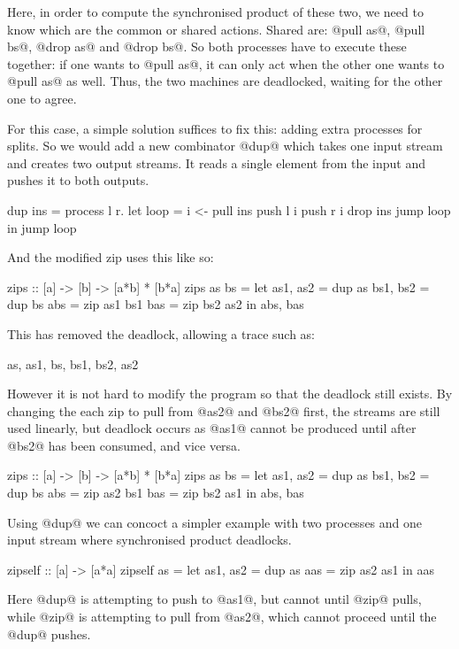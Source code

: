 Here, in order to compute the synchronised product of these two, we need to know which are the common or shared actions.
Shared are: @pull as@, @pull bs@, @drop as@ and @drop bs@.
So both processes have to execute these together: if one wants to @pull as@, it can only act when the other one wants to @pull as@ as well.
Thus, the two machines are deadlocked, waiting for the other one to agree.

For this case, a simple solution suffices to fix this: adding extra processes for splits. So we would add a new combinator @dup@ which takes one input stream and creates two output streams. It reads a single element from the input and pushes it to both outputs.

\begin{code}
dup ins = process l r.
  let loop =
     i <- pull ins
     push l i
     push r i
     drop ins
     jump loop
  in jump loop
\end{code}
And the modified zip uses this like so:

\begin{code}
zips :: [a] -> [b] -> [a*b] * [b*a]
zips as bs =
  let as1, as2 = dup as
      bs1, bs2 = dup bs
      abs = zip as1 bs1
      bas = zip bs2 as2
  in  abs, bas
\end{code}

This has removed the deadlock, allowing a trace such as:
\begin{code}
as, as1, bs, bs1, bs2, as2
\end{code}

However it is not hard to modify the program so that the deadlock still exists.
By changing the each zip to pull from @as2@ and @bs2@ first, the streams are still used linearly, but deadlock occurs as @as1@ cannot be produced until after @bs2@ has been consumed, and vice versa.
\begin{code}
zips :: [a] -> [b] -> [a*b] * [b*a]
zips as bs =
  let as1, as2 = dup as
      bs1, bs2 = dup bs
      abs = zip as2 bs1
      bas = zip bs2 as1
  in  abs, bas
\end{code}

Using @dup@ we can concoct a simpler example with two processes and one input stream where synchronised product deadlocks.
\begin{code}
zipself :: [a] -> [a*a]
zipself as =
  let as1, as2 = dup as
      aas = zip as2 as1
  in  aas
\end{code}
Here @dup@ is attempting to push to @as1@, but cannot until @zip@ pulls, while @zip@ is attempting to pull from @as2@, which cannot proceed until the @dup@ pushes.

